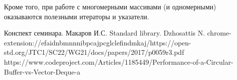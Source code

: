 \documentclass[a4paper,12pt]{article}	%
\begin{document}
	Кроме того, при работе с многомерными массивами (и одномерными) оказываются полезными	итераторы и указатели.
	
\newpage


 
	\begin{thebibliography}{}
	
		 Конспект семинара. Макаров И.С.
		 Standard library. Dzhosattis N.
		 chrome-extension://efaidnbmnnnibpcajpcglclefindmkaj/https://open-std.org/JTC1/SC22/WG21/docs/papers/2017/p0059r3.pdf
		 https://www.codeproject.com/Articles/1185449/Performance-of-a-Circular-Buffer-vs-Vector-Deque-a
		
	\end{thebibliography}
\end{document}
